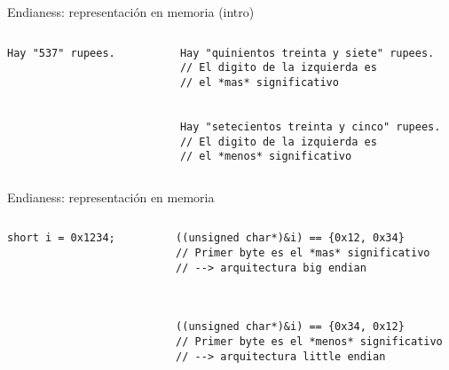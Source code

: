 \begin{frame}[fragile]{Endianess: representaci\'on en memoria (intro)}
   \begin{columns}
      \begin{column}{.03\linewidth}
         \begin{lstlisting}[style=normalnonumbers]
Hay "537" rupees.



         \end{lstlisting}
      \end{column}
      \begin{column}{.01\linewidth}
      \end{column}
      \begin{column}{.6\linewidth}
         \vspace*{5mm}
         \begin{lstlisting}[style=normalnonumbers]
Hay "quinientos treinta y siete" rupees.
// El digito de la izquierda es
// el *mas* significativo


Hay "setecientos treinta y cinco" rupees.
// El digito de la izquierda es
// el *menos* significativo
         \end{lstlisting}
      \end{column}
   \end{columns}
\end{frame}
\begin{frame}[fragile]{Endianess: representaci\'on en memoria}
   \begin{columns}
      \begin{column}{.03\linewidth}
         \begin{lstlisting}[style=normalnonumbers]
short i = 0x1234;



         \end{lstlisting}
      \end{column}
      \begin{column}{.01\linewidth}
      \end{column}
      \begin{column}{.6\linewidth}
         \vspace*{5mm}
         \begin{lstlisting}[style=normalnonumbers]
((unsigned char*)&i) == {0x12, 0x34}
// Primer byte es el *mas* significativo
// --> arquitectura big endian



((unsigned char*)&i) == {0x34, 0x12}
// Primer byte es el *menos* significativo
// --> arquitectura little endian
         \end{lstlisting}
      \end{column}
   \end{columns}
\end{frame}
